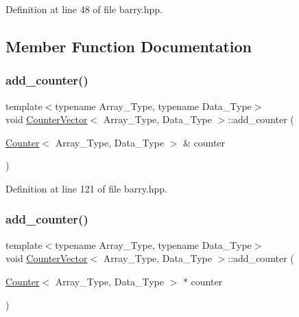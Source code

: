 Definition at line 48 of file barry.\+hpp.



\subsection{Member Function Documentation}
\mbox{\label{classbarry_1_1_counter_vector_a34fda06ff678691daf3b0455c1a2af48}} 
\subsubsection{\texorpdfstring{add\+\_\+counter()}{add\_counter()}\hspace{0.1cm}{\footnotesize\ttfamily [1/3]}}
{\footnotesize\ttfamily template$<$typename Array\+\_\+\+Type, typename Data\+\_\+\+Type$>$ \\
void \hyperlink{classbarry_1_1_counter_vector}{Counter\+Vector}$<$ Array\+\_\+\+Type, Data\+\_\+\+Type $>$\+::add\+\_\+counter (\begin{DoxyParamCaption}\item[{\hyperlink{classbarry_1_1_counter}{Counter}$<$ Array\+\_\+\+Type, Data\+\_\+\+Type $>$ \&}]{counter }\end{DoxyParamCaption})\hspace{0.3cm}{\ttfamily [inline]}}



Definition at line 121 of file barry.\+hpp.

\mbox{\label{classbarry_1_1_counter_vector_a062d52e18f1d3ba4c00cbf4c2d89f1e7}} 
\subsubsection{\texorpdfstring{add\+\_\+counter()}{add\_counter()}\hspace{0.1cm}{\footnotesize\ttfamily [2/3]}}
{\footnotesize\ttfamily template$<$typename Array\+\_\+\+Type, typename Data\+\_\+\+Type$>$ \\
void \hyperlink{classbarry_1_1_counter_vector}{Counter\+Vector}$<$ Array\+\_\+\+Type, Data\+\_\+\+Type $>$\+::add\+\_\+counter (\begin{DoxyParamCaption}\item[{\hyperlink{classbarry_1_1_counter}{Counter}$<$ Array\+\_\+\+Type, Data\+\_\+\+Type $>$ $\ast$}]{counter }\end{DoxyParamCaption})\hspace{0.3cm}{\ttfamily [inline]}}




